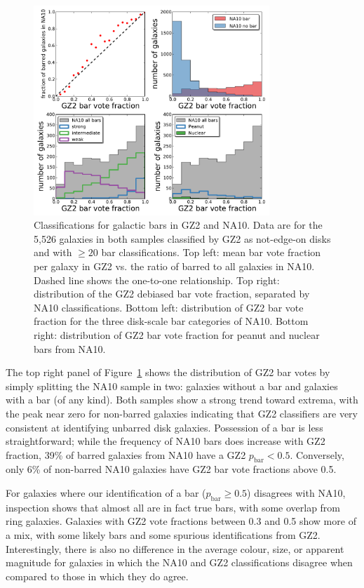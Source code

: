 \documentclass[useAMS,usenatbib]{mn2e}
\begin{document}
\begin{figure}
\includegraphics[angle=0,width=3.5in]{figures/na_bars.pdf}
\caption{Classifications for galactic bars in GZ2 and NA10. Data are for the 5,526 galaxies in both samples classified by GZ2 as not-edge-on disks and with $\geq20$ bar classifications. Top left: mean bar vote fraction per galaxy in GZ2 vs. the ratio of barred to all galaxies in NA10. Dashed line shows the one-to-one relationship. Top right: distribution of the GZ2 debiased bar vote fraction, separated by NA10 classifications. Bottom left: distribution of GZ2 bar vote fraction for the three disk-scale bar categories of NA10. Bottom right: distribution of GZ2 bar vote fraction for peanut and nuclear bars from NA10. 
\label{fig-na_bars}}
\end{figure}

The top right panel of Figure~\ref{fig-na_bars} shows the distribution of GZ2 bar votes by simply splitting the NA10 sample in two: galaxies without a bar and galaxies with a bar (of any kind). Both samples show a strong trend toward extrema, with the peak near zero for non-barred galaxies indicating that GZ2 classifiers are very consistent at identifying unbarred disk galaxies. Possession of a bar is less straightforward; while the frequency of NA10 bars does increase with GZ2 fraction, 39\% of barred galaxies from NA10 have a GZ2 $p_\mathrm{bar}<0.5$. Conversely, only 6\% of non-barred NA10 galaxies have GZ2 bar vote fractions above 0.5. 

For galaxies where our identification of a bar ($p_\mathrm{bar}\geq0.5$) disagrees with NA10, inspection shows that almost all are in fact true bars, with some overlap from ring galaxies. Galaxies with GZ2 vote fractions between 0.3 and 0.5 show more of a mix, with some likely bars and some spurious identifications from GZ2. Interestingly, there is also no difference in the average colour, size, or apparent magnitude for galaxies in which the NA10 and GZ2 classifications disagree when compared to those in which they do agree. 
\end{document}
